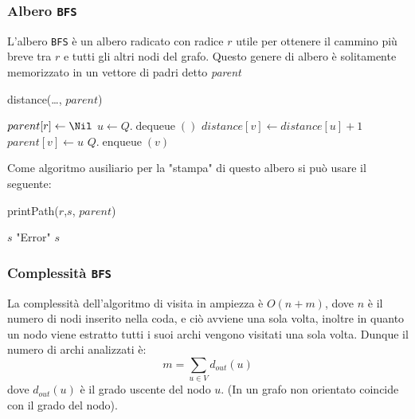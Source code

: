         \subsubsection{Albero \texttt{BFS}} 
            L'albero \texttt{BFS} è un albero radicato con radice $r$ utile per ottenere il cammino più breve tra $r$ e tutti gli altri nodi del grafo. Questo genere di albero è solitamente memorizzato in un vettore di padri detto \textit{parent}
            \begin{algorithm}
                \caption{distance(\dots, \Int[] $parent$)}
                \begin{algorithmic}
                    \State [\dots]
                    \State $ parent[r] \gets \Nil $
                        \State \Node $ u \gets Q.\operatorname{dequeue}() $
                                \State $ distance[v] \gets distance[u] + 1 $
                                \State $ parent[v] \gets u $
                                \State $ Q.\operatorname{enqueue}(v) $
                            \EndIf
                        \EndFor
                    \EndWhile
                \end{algorithmic}
            \end{algorithm}
            Come algoritmo ausiliario per la "stampa" di questo albero si può usare il seguente:
            \begin{algorithm}
                \caption{printPath(\Node $r$,\Node $s$, \Node[] $parent$)}
                \begin{algorithmic}
                        \State \Print $ s $
                        \State \Print "Error"
                    \Else
                        \State {}
                        \State \Print $ s $
                    \EndIf
                \end{algorithmic}
            \end{algorithm}
        \subsubsection{Complessità \texttt{BFS}}
            La complessità dell'algoritmo di visita in ampiezza è $O(n+m)$, dove $n$ è il numero di nodi inserito nella coda, e ciò avviene una sola volta, inoltre in quanto un nodo viene estratto tutti i suoi archi vengono visitati una sola volta. Dunque il numero di archi analizzati è:
            $$
                m=\sum_{u\in V} d_{out}(u)
            $$
            dove $d_{out}(u)$ è il grado uscente del nodo $u$. (In un grafo non orientato coincide con il grado del nodo).
